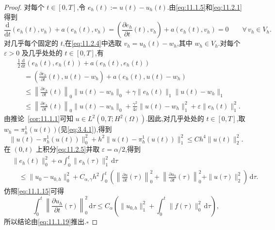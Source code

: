 \begin{proof}
对每个 \(t\in[0,T]\),令 \(e_h(t):=u(t)-u_h(t)\).由\eqref{eq:11.1.5}和\eqref{eq:11.2.1}得到
\begin{equation}\label{eq:11.2.4}
  \frac{\mathrm d}{\mathrm dt}(e_h(t),v_h)+a(e_h(t),v_h)
       =\left(\frac{\partial e_h}{\partial t}(t),v_h\right)
           +a(e_h(t),v_h)=0\qquad\forall\,v_h\in V_h .
\end{equation}
对几乎每个固定的 \(t\),在\eqref{eq:11.2.4}中选取 \(v_h=u_h(t)-w_h\),其中 \(w_h\in V_h\).对每个 \(\varepsilon>0\) 及几乎处处的 \(t\in[0,T]\),有
\begin{equation}\label{eq:11.2.5}
  \begin{aligned}
    &\frac12\frac{\mathrm d}{\mathrm dt}(e_h(t),e_h(t))+a(e_h(t),e_h(t))\\
    &\quad=\left(\frac{\partial e_h}{\partial t}(t),u(t)-w_h\right)
                   +a(e_h(t),u(t)-w_h)\\
    &\quad\le\left\|\frac{\partial e_h}{\partial t}(t)\right\|_0\|u(t)-w_h\|_0
                  +\gamma\|e_h(t)\|_1\|u(t)-w_h\|_1\\
    &\quad\le\left\|\frac{\partial e_h}{\partial t}(t)\right\|_0\|u(t)-w_h\|_0
                  +\frac{\gamma^2}{4\varepsilon}\|u(t)-w_h\|_1^2
                  +\varepsilon\|e_h(t)\|_1^2 .
  \end{aligned}
\end{equation}
由推论~\ref{cor:11.1.1}可知 \(u\in L^2(0,T;H^2(\Omega))\).因此,对几乎处处的 \(t\in[0,T]\),取 \(w_h=\pi_h^1(u(t))\)(见\eqref{eq:3.4.1}),得到
\[
  \|u(t)-\pi_h^1(u(t))\|_0^2+h^2\|u(t)-\pi_h^1(u(t))\|_1^2
       \le Ch^4\|u(t)\|_2^2 .
\]
在 \((0,t)\) 上积分\eqref{eq:11.2.5}并取 \(\varepsilon=\alpha/2\),得到
\[
  \begin{aligned}
    &\|e_h(t)\|_0^2+\alpha\int_0^t\|e_h(\tau)\|_1^2\,\mathrm d\tau\\
    &\quad\le\|u_0-u_{0,h}\|_0^2
      +C_{\alpha,\gamma}h^2\int_0^t\left(
          \left\|\frac{\partial u}{\partial t}(\tau)\right\|_0^2
         +\left\|\frac{\partial u_h}{\partial t}(\tau)\right\|_0^2
         +\|u(\tau)\|_2^2\right)\,\mathrm d\tau .
  \end{aligned}
\]
仿照\eqref{eq:11.1.15}可得
\[
  \int_0^t\left\|\frac{\partial u_h}{\partial t}(\tau)\right\|_0^2\,\mathrm d\tau
        \le C_\alpha\left(\|u_{0,h}\|_1^2+\int_0^t\|f(\tau)\|_0^2\,\mathrm d\tau\right),
\]
所以结论由\eqref{eq:11.1.19}推出.\hfill\(\square\)
\end{proof}


